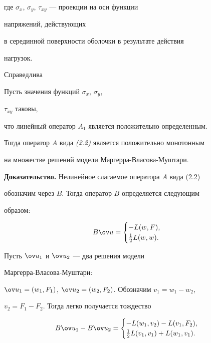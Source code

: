где $\sigma_x$, $\sigma_y$, $\tau_{xy}$ --- проекции на оси функции 


напряжений, действующих 


в серединной поверхности оболочки в результате действия 


нагрузок. 


 


Справедлива 


 


\begin{thms} Пусть значения функций $\sigma_x$, $\sigma_y$, 


$\tau_{xy}$ таковы, 


что линейный оператор $A_1$ является положительно определенным. 


Тогда оператор $A$ вида {\em (2.2)} является положительно монотонным 


на множестве решений модели Маргерра-Власова-Муштари. 


\end{thms} 


 


{\bf Доказательство.} Нелинейное слагаемое оператора $A$ вида (2.2) 


обозначим через $B$. Тогда оператор $B$ определяется следующим 


образом: 


$$ 


B\ov u= 


\begin{cases} 


-L(w,F),\\ 


\frac{1}{2}L(w,w). 


\end{cases} 


$$ 


 


Пусть $\ov u_1$ и $\ov u_2$ --- два решения модели 


Маргерра-Власова-Муштари: 


$\ov u_1=(w_1,F_1)$, $\ov u_2=(w_2,F_2)$. Обозначим $v_1=w_1-w_2$, 


$v_2=F_1-F_2$. Тогда легко получается тождество 


\begin{equation} 


B\ov u_1-B\ov u_2= 


\begin{cases} 


-L(w_1,v_2)-L(v_1,F_2),\\ 


\frac{1}{2}L(v_1,v_1)+L(w_1,v_1). 


\end{cases} 


\end{equation} 


